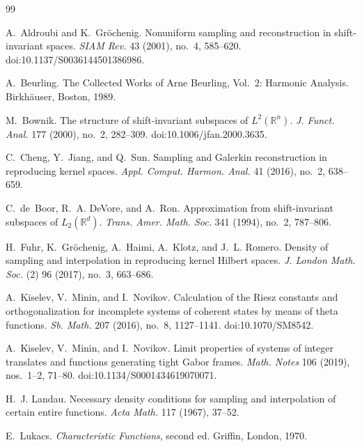 \begin{thebibliography}{99}

A.~Aldroubi and K.~Gr{\"o}chenig.
\newblock Nonuniform sampling and reconstruction in shift-invariant spaces.
\newblock \emph{SIAM Rev.} 43 (2001), no.~4, 585--620.
\newblock doi:10.1137/S0036144501386986.

A.~Beurling.
\newblock The Collected Works of Arne Beurling, Vol.~2: Harmonic Analysis.
\newblock Birkh{\"a}user, Boston, 1989.

M.~Bownik.
\newblock The structure of shift-invariant subspaces of $L^2(\mathbb R^n)$.
\newblock \emph{J. Funct. Anal.} 177 (2000), no.~2, 282--309.
\newblock doi:10.1006/jfan.2000.3635.

C.~Cheng, Y.~Jiang, and Q.~Sun.
\newblock Sampling and Galerkin reconstruction in reproducing kernel spaces.
\newblock \emph{Appl. Comput. Harmon. Anal.} 41 (2016), no.~2, 638--659.

C.~de~Boor, R.~A. DeVore, and A.~Ron.
\newblock Approximation from shift-invariant subspaces of $L_2(\mathbb R^d)$.
\newblock \emph{Trans. Amer. Math. Soc.} 341 (1994), no.~2, 787--806.

H.~Fuhr, K.~Gr{\"o}chenig, A.~Haimi, A.~Klotz, and J.~L. Romero.
\newblock Density of sampling and interpolation in reproducing kernel Hilbert
spaces.
\newblock \emph{J. London Math. Soc.} (2) 96 (2017), no.~3, 663--686.

A.~Kiselev, V.~Minin, and I.~Novikov.
\newblock Calculation of the Riesz constants and orthogonalization for
incomplete systems of coherent states by means of theta functions.
\newblock \emph{Sb. Math.} 207 (2016), no.~8, 1127--1141.
\newblock doi:10.1070/SM8542.

A.~Kiselev, V.~Minin, and I.~Novikov.
\newblock Limit properties of systems of integer translates and functions
generating tight Gabor frames.
\newblock \emph{Math. Notes} 106 (2019), nos.~1--2, 71--80.
\newblock doi:10.1134/S0001434619070071.

H.~J. Landau.
\newblock Necessary density conditions for sampling and interpolation of
certain entire functions.
\newblock \emph{Acta Math.} 117 (1967), 37--52.

E.~Lukacs.
\newblock \emph{Characteristic Functions}, second ed.
\newblock Griffin, London, 1970.


\end{thebibliography}
